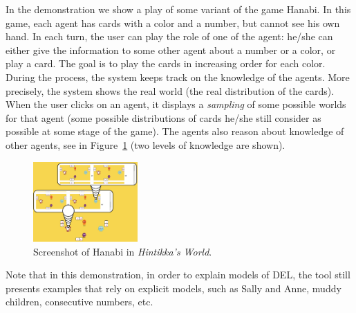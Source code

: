 
In the demonstration we show a play of some variant of the game Hanabi. 
In this game, each agent has cards with a color and a
number, but cannot see his own hand.
In each turn, the user can play the role of one of the agent: he/she can either give the information to some other agent about a number or a color, or play a card. The goal is to play the cards in increasing order for each color.
During the process, the system keeps track on the knowledge of the agents.
More precisely, the system shows the real world (the real distribution of the cards). When the user clicks on an agent, it displays a \emph{sampling} of some possible worlds for that agent (some possible distributions of cards he/she still consider as possible at some stage of the game). The agents also reason about knowledge of other agents, see in Figure~\ref{figure:guihanabi} (two levels of knowledge are shown).
%
%
%


\begin{figure}
	\begin{center}
		\includegraphics[width=4cm]{images/HW_screenshot_hanabi.png}
	\end{center}
\vspace{-3mm}
	\caption{Screenshot of Hanabi in \emph{Hintikka's World}.\label{figure:guihanabi}}
\end{figure}

Note that in this demonstration, in order to explain models of DEL, the tool still presents examples that rely on explicit models, such as Sally and Anne, muddy children, consecutive numbers, etc.